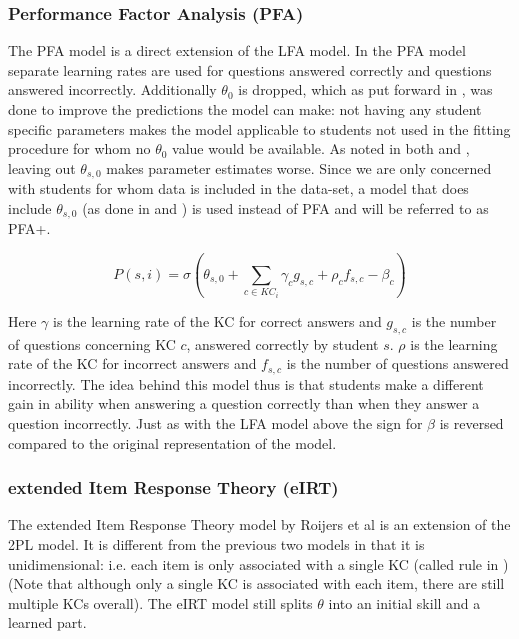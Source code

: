 \documentclass{scrartcl}
\begin{document}
\subsubsection{Performance Factor Analysis (PFA)}
\label{sec:pfa}
The PFA model is a direct extension of the LFA model. In the PFA model separate learning rates are used for questions answered correctly and questions answered incorrectly. Additionally $\theta_{0}$ is dropped, which as put forward in \cite{pfa}, was done to improve the predictions the model can make: not having any student specific parameters makes the model applicable to students not used in the fitting procedure for whom no $\theta_{0}$ value would be available. As noted in both \cite{ktpfa} and \cite{blackart}, leaving out $\theta_{s,0}$ makes parameter estimates worse. Since we are only concerned with students for whom data is included in the data-set, a model that does include $\theta_{s,0}$ (as done in \cite{ktpfa} and \cite{blackart}) is used instead of PFA and will be referred to as PFA+.

\begin{equation}
\label{eq:pfa}
P(s,i) = \sigma(\theta_{s,0} + \sum_{c \in KC_{i}}  \gamma_{c} g_{s,c} + \rho_{c} f_{s,c} - \beta_{c})
\end{equation}


Here $\gamma$ is the learning rate of the KC for correct answers and $g_{s,c}$ is the number of questions concerning KC $c$, answered correctly by student $s$. $\rho$ is the learning rate of the KC for incorrect answers and $f_{s,c}$ is the number of questions answered incorrectly. The idea behind this model thus is that students make a different gain in ability when answering a question correctly than when they answer a question incorrectly. Just as with the LFA model above the sign for $\beta$ is reversed compared to the original representation of the model.

\subsubsection{extended Item Response Theory (eIRT)}
\label{sec:eIRT}
The extended Item Response Theory model by Roijers et al \cite{eirt} is an extension of the 2PL model. It is different from the previous two models in that it is unidimensional: i.e. each item is only associated with a single KC (called rule in \cite{eirt}) (Note that although only a single KC is associated with each item, there are still multiple KCs overall). The eIRT model still splits $\theta$ into an initial skill and a learned part. 
\end{document}
